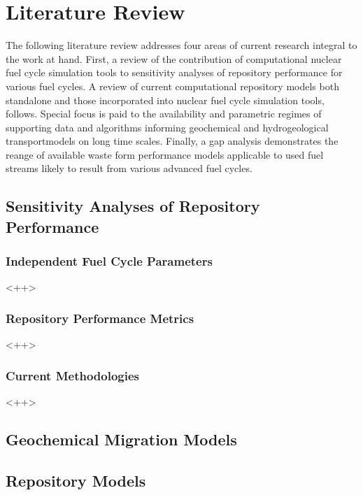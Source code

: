 \chapter{Literature Review}
The following literature review addresses four areas of current research integral to the work at hand. First, a review of the contribution of computational nuclear fuel cycle simulation tools to sensitivity analyses of repository performance for various fuel cycles. A review of current computational repository models both standalone and those incorporated into nuclear fuel cycle simulation tools, follows. Special focus is paid to the availability and parametric regimes of supporting data and algorithms informing geochemical and hydrogeological transportmodels on long time scales. Finally, a gap analysis demonstrates the reange of available waste form performance models applicable to used fuel streams likely to result from various advanced fuel cycles.   
\section{Sensitivity Analyses of Repository Performance}

\subsection{Independent Fuel Cycle Parameters}<++>
\subsection{Repository Performance Metrics}<++>
\subsection{Current Methodologies}<++>

\section{Geochemical Migration Models}
\section{Repository Models}
